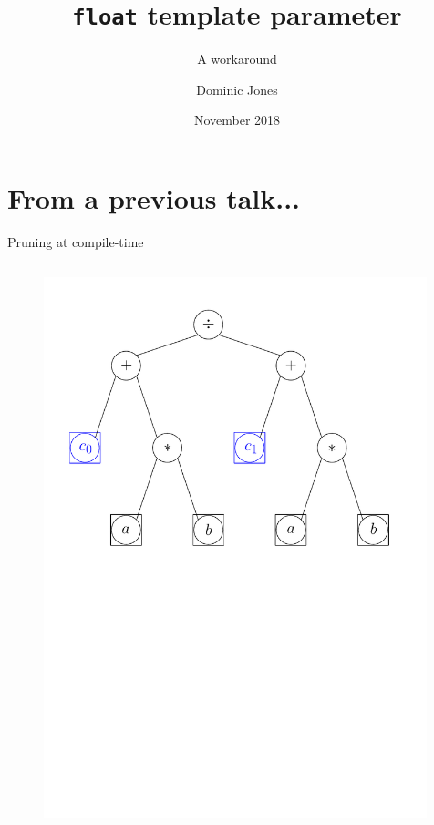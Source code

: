 \documentclass[xcolor=dvipsnames]{beamer}
\title{\texttt{float} template parameter}
\subtitle{A workaround}
\author{Dominic Jones}
\date{\small{November 2018}}
\institute{\small{\texttt{github.com/DominicJones}}}
\begin{document}
\begin{frame}[plain]
  \titlepage
\end{frame}


\section{From a previous talk...}


\begin{frame}[fragile]{Pruning at compile-time}
  \begin{columns}[T] %
    \begin{column}{0.75\textwidth}
      \begin{figure}[H]
        \centering
        \includegraphics[width=0.99\textwidth]{fig_exprtree_cb}
      \end{figure}
    \end{column}%
  \end{columns}
\end{frame}
\end{document}

